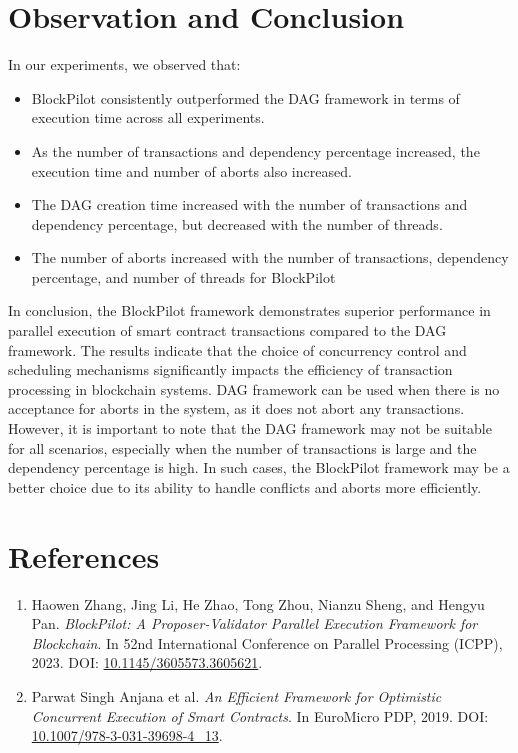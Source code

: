 \documentclass[12pt]{article}
\begin{document}
\section{Observation and Conclusion}
In our experiments, we observed that:
\begin{itemize}
    \item BlockPilot consistently outperformed the DAG framework in terms of execution time across all experiments.
    \item As the number of transactions and dependency percentage increased, the execution time and number of aborts also increased.
    \item The DAG creation time increased with the number of transactions and dependency percentage, but decreased with the number of threads.
    \item The number of aborts increased with the number of transactions, dependency percentage, and number of threads for BlockPilot
\end{itemize}
In conclusion, the BlockPilot framework demonstrates superior performance in parallel execution of smart contract transactions compared to the DAG framework. The results indicate that the choice of concurrency control and scheduling mechanisms significantly impacts the efficiency of transaction processing in blockchain systems. 
DAG framework can be used when there is no acceptance for aborts in the system, as it does not abort any transactions.
However, it is important to note that the DAG framework may not be suitable for all scenarios, especially when the number of transactions is large and the dependency percentage is high. In such cases, the BlockPilot framework may be a better choice due to its ability to handle conflicts and aborts more efficiently.


\section{References}

\begin{enumerate}
    \item Haowen Zhang, Jing Li, He Zhao, Tong Zhou, Nianzu Sheng, and Hengyu Pan. \textit{BlockPilot: A Proposer-Validator Parallel Execution Framework for Blockchain}. In 52nd International Conference on Parallel Processing (ICPP), 2023. DOI: \href{https://doi.org/10.1145/3605573.3605621}{10.1145/3605573.3605621}.
    \item Parwat Singh Anjana et al. \textit{An Efficient Framework for Optimistic Concurrent Execution of Smart Contracts}. In EuroMicro PDP, 2019. DOI: \href{https://doi.org/10.1007/978-3-031-39698-4_13}{10.1007/978-3-031-39698-4\_13}.
\end{enumerate}
\end{document}

